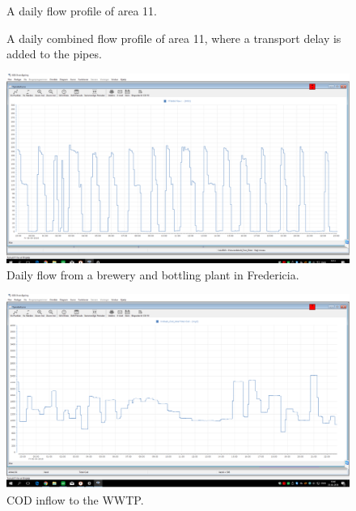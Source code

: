 \begin{figure}[H]
\centering

\caption{A daily flow profile of area 11.}
\label{fig:APP_flow_profile_zone11}
\end{figure} 

\begin{figure}[H]
\centering

\caption{A daily combined flow profile of area 11, where a transport delay is added to the pipes.}
\label{fig:flow_profile_zone_11_combined_with_delay}
\end{figure} 


\begin{figure}[H]
	\centering
	\includegraphics[width=0.95\textheight, angle=-90]{report/appendix/figures/Carlsberg_data.png}
	\caption{Daily flow from a brewery and bottling plant in Fredericia.}
	\label{fig:Carlsberg_data}
\end{figure}

\begin{figure}[H]
	\centering
	\includegraphics[width=0.95\textheight, angle=-90]{report/appendix/figures/COD_data.png}
	\caption{COD inflow to the WWTP.}
	\label{fig:COD_data}
\end{figure}

